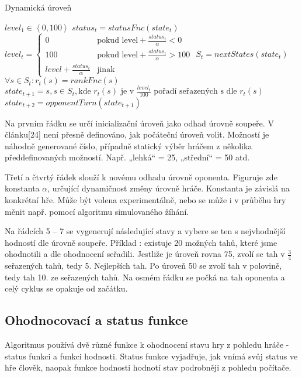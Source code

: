 \begin{algorithm}
\caption{Dynamická úroveň}
\label{alg-dynlevel}
\begin{algorithmic}[1]
\State $level_1 \in \left\langle 0, 100 \right\rangle$
	 \State $status_t = statusFnc(state_t)$
	 \State $level_t = \begin{cases}
											  0 & \text{pokud level} + \frac{status_t}{\alpha} < 0 \\
												100 & \text{pokud level} + \frac{status_t}{\alpha} > 100 \\
												level + \frac{status_t}{\alpha}  & \text{jinak}
										 \end{cases}
						 $
   \State $S_t = nextStates(state_t)$
	 \State $\forall s \in S_t : r_t(s) = rankFnc(s)$
	 \State $state_{t+1} = s, s \in S_t, \text{kde } r_t(s) \text{ je v } \frac{level_t}{100} \text{ pořadí seřazených s dle } r_t(s)$
	 \State $state_{t+2} = opponentTurn(state_{t+1})$
\EndFor
\end{algorithmic}
\end{algorithm}

Na prvním řádku se určí inicializační úroveň jako odhad úrovně soupeře. V článku[24] není přesně definováno, jak počáteční úroveň volit. Možností je náhodně generované číslo, případně statický výběr hráčem z několika předdefinovaných možností. Např. „lehká“ = 25, „střední“ = 50 atd.

Třetí a čtvrtý řádek slouží k novému odhadu úrovně oponenta. Figuruje zde konstanta $\alpha$, určující dynamičnost změny úrovně hráče. Konstanta je závislá na konkrétní hře. Může být volena experimentálně, nebo se může i v průběhu hry měnit např. pomocí algoritmu simulovaného žíhání.

Na řádcích 5 – 7 se vygenerují následující stavy a vybere se ten s nejvhodnější hodností dle úrovně soupeře. Příklad : existuje 20 možných tahů, které jsme ohodnotili a dle ohodnocení seřadili. Jestliže je úroveň rovna 75, zvolí se tah v $\frac{3}{4}$ seřazených tahů, tedy 5. Nejlepších tah. Po úroveň 50 se zvolí tah v polovině, tedy tah 10. ze seřazených tahů.
Na osmém řádku se počká na tah oponenta a celý cyklus se opakuje od začátku.

\subsection{Ohodnocovací a status funkce}

Algoritmus používá dvě různé funkce k ohodnocení stavu hry z pohledu hráče - status funkci a funkci hodnosti. Status funkce vyjadřuje, jak vnímá svůj status ve hře člověk, naopak funkce hodnosti hodnotí stav podrobněji z pohledu počítače. 

